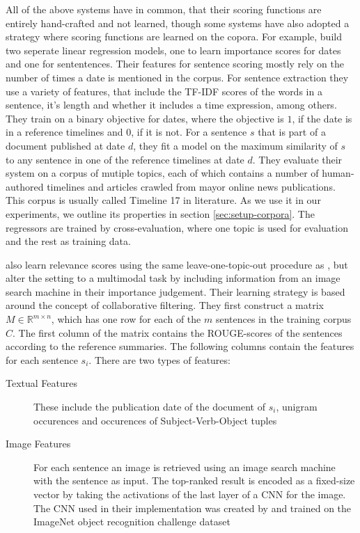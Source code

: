 \documentclass[a4paper,BCOR=10mm]{report}
\numberwithin{lemma}{chapter}
\numberwithin{definition}{chapter}
\begin{document}
All of the above systems have in common, that their scoring functions are entirely hand-crafted and not learned, though some systems have also adopted a strategy where scoring functions are learned on the copora.
For example, \citet{tran-relevant} build two seperate linear regression models, one to learn importance scores for dates and one for sententences.
Their features for sentence scoring mostly rely on the number of times a date is mentioned in the corpus.
For sentence extraction they use a variety of features, that include the TF-IDF scores of the words in a sentence, it's length and whether it includes a time expression, among others.
They train on a binary objective for dates, where the objective is $1$, if the date is in a reference timelines and $0$, if it is not.
For a sentence $s$ that is part of a document published at date $d$, they fit a model on the maximum similarity of $s$ to any sentence in one of the reference timelines at date $d$.
They evaluate their system on a corpus of mutiple topics, each of which contains a number of human-authored timelines and articles crawled from mayor online news publications. This corpus is usually called Timeline 17 in literature. As we use it in our experiments, we outline its properties in section \ref{sec:setup-corpora}. The regressors are trained by cross-evaluation, where one topic is used for evaluation and the rest as training data.

\citet{multimodal} also learn relevance scores using the same leave-one-topic-out procedure as \citet{tran-relevant}, but alter the setting to a multimodal task by including information from an image search machine in their importance judgement.
Their learning strategy is based around the concept of collaborative filtering.
They first construct a matrix $M \in \mathbb{R}^{m \times n}$, which has one row for each of the $m$ sentences in the training corpus $C$. The first column of the matrix contains the ROUGE-scores of the sentences according to the reference summaries. The following columns contain the features for each sentence $s_i$.
There are two types of features:

\begin{description}
\item[Textual Features]{These include the publication date of the document of $s_i$, unigram occurences and occurences of Subject-Verb-Object tuples}
\item[Image Features]{For each sentence an image is retrieved using an image search machine with the sentence as input. The top-ranked result is encoded as a fixed-size vector by taking the activations of the last layer of a CNN for the image. The CNN used in their implementation was created by \citet{Simonyan+Zisserman} and trained on the ImageNet \citep{ImageNet} object recognition challenge dataset}
\end{description}
\end{document}
